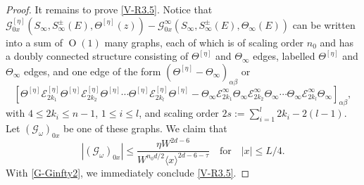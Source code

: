 \documentclass{article}
\newcommand{\1}{\mathds{1}}
\numberwithin{equation}{section}
\newcommand{\al}{\alpha}
\newcommand{\be}{\begin{equation}}
\newcommand{\ee}{\end{equation}}
\renewcommand{\cal}{\mathcal}
\newcommand{\wt}{\widetilde}
\renewcommand{\leq}{\leqslant}
\renewcommand{\le}{\leq}
\DeclareMathOperator{\OO}{O}
\theoremstyle{plain} %
\theoremstyle{remark}
\newcommand{\Sdelta}{{\Sigma}_T}
\newcommand{\wtSdelta}{\Sigma}
\newcommand{\Sinfty}{\Sigma^{\infty}}
\newcommand{\wtSinfty}{\wt\Sigma^{\infty}}
\newcommand{\Sele}{{\mathcal E}}
\begin{document}
\begin{proof}
It remains to prove \eqref{V-R3.5}. %
Notice that ${\cal G}^{[\eta]}_{0x} (S_\infty, S^{\pm}_\infty(E),\Theta^{[\eta]}(z))-\cal G^{\infty}_{0x}
(S_\infty, S^{\pm}_\infty(E), \Theta_\infty (E))$ can be written into a sum of $\OO(1)$ many graphs, each of which is of scaling order $n_0$ and has a doubly connected structure consisting of $\Theta^{[\eta]}$ and $\Theta_\infty$ edges, labelled $\Theta^{[\eta]}$ and $\Theta_\infty$ edges, and one edge of the form $(\Theta^{[\eta]}-\Theta_\infty)_{\al\beta}$ or  
\be\label{diff label}
\left[\Theta^{[\eta]} \Sele^{[\eta]}_{2k_1}\Theta^{[\eta]}  \Sele^{[\eta]}_{2k_2}\Theta^{[\eta]} \cdots \Theta^{[\eta]}  \Sele^{[\eta]}_{2k_l}\Theta^{[\eta]}-\Theta_\infty \Sele^{\infty}_{2k_1}\Theta_\infty  \Sele^{\infty}_{2k_2}\Theta_\infty \cdots \Theta_\infty  \Sele^{\infty}_{2k_l}\Theta_\infty \right]_{\al\beta} ,\ee
with $4\le 2k_i \le n-1$, $1\le i \le l$, and scaling order $2s:= \sum_{i=1}^l 2k_i-2(l-1)$. 
Let $(\cal G_\omega)_{0x}$ be one of these graphs. We claim that 
\be\label{G-Ginfty2}   \left|(\cal G_\omega)_{0x}\right| \le \frac{\eta W^{2d-6}}{W^{n_0d/2}\langle x\rangle^{2d-6-\tau}} \quad \text{for}\quad |x| \le L/4.
\ee
With \eqref{G-Ginfty2}, we immediately conclude \eqref{V-R3.5}.


\end{proof}
\end{document}
